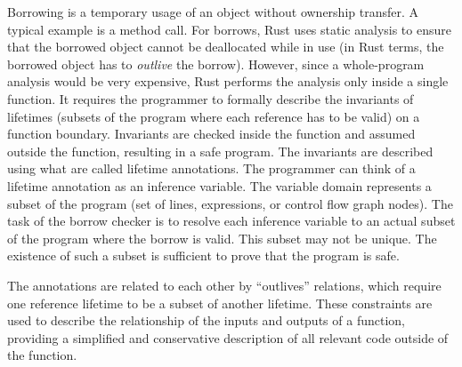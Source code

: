 \documentclass[
  11pt,
  twoside,symmetric]{report}
\begin{document}
Borrowing is a temporary usage of an object without ownership transfer.
A typical example is a method call. For borrows, Rust uses static
analysis to ensure that the borrowed object cannot be deallocated while
in use (in Rust terms, the borrowed object has to \emph{outlive} the
borrow). However, since a whole-program analysis would be very
expensive, Rust performs the analysis only inside a single function. It
requires the programmer to formally describe the invariants of lifetimes
(subsets of the program where each reference has to be valid) on a
function boundary. Invariants are checked inside the function and
assumed outside the function, resulting in a safe program. The
invariants are described using what are called lifetime annotations. The
programmer can think of a lifetime annotation as an inference variable.
The variable domain represents a subset of the program (set of lines,
expressions, or control flow graph nodes). The task of the borrow
checker is to resolve each inference variable to an actual subset of the
program where the borrow is valid. This subset may not be unique. The
existence of such a subset is sufficient to prove that the program is
safe.

The annotations are related to each other by ``outlives'' relations,
which require one reference lifetime to be a subset of another lifetime.
These constraints are used to describe the relationship of the inputs
and outputs of a function, providing a simplified and conservative
description of all relevant code outside of the function.
\end{document}
